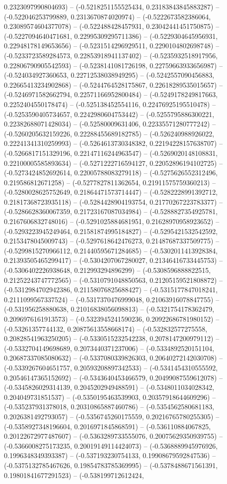 0.2323097990804693) -- (-0.5218251155525434, 0.23183843845883287) -- (-0.522046253799889, 0.2313670874020974) -- (-0.5222673582386064, 0.23089574604377078) -- (-0.522488428457931, 0.23042441451750875) -- (-0.5227094640471681, 0.22995309295711386) -- (-0.5229304645956931, 0.22948178149653656) -- (-0.5231514296929511, 0.2290104802698748) -- (-0.5233723589284573, 0.22853918941137402) -- (-0.5235932518917956, 0.22806790905542593) -- (-0.5238141081726198, 0.22759663933656987) -- (-0.524034927360653, 0.22712538038949295) -- (-0.5242557090456883, 0.22665413234902868) -- (-0.5244764528175867, 0.22618289535015657) -- (-0.5246971582662794, 0.22571166952800484) -- (-0.5249178249817663, 0.2252404550178474) -- (-0.525138452554116, 0.22476925195510478) -- (-0.5253590405734657, 0.2242980604753442) -- (-0.5255795886300221, 0.22382688071428034) -- (-0.52580009631406, 0.22335571280777242) -- (-0.5260205632159226, 0.22288455689182785) -- (-0.526240988926022, 0.22241341310259993) -- (-0.5264613730348382, 0.22194228157638707) -- (-0.5266817151329196, 0.22147116244963547) -- (-0.5269020148108831, 0.22100005585893634) -- (-0.5271222716594127, 0.22052896194102725) -- (-0.5273424852692614, 0.22005788083279118) -- (-0.5275626552312496, 0.219586812671258) -- (-0.5277827811362654, 0.21911575759360213) -- (-0.5280028625752649, 0.21864471573714447) -- (-0.5282228991392712, 0.21817368723935118) -- (-0.5284428904193754, 0.21770267223783377) -- (-0.5286628360067359, 0.21723167087034984) -- (-0.5288827354925781, 0.2167606832748016) -- (-0.5291025884681951, 0.21628970958923652) -- (-0.5293223945249464, 0.21581874995184827) -- (-0.5295421532542592, 0.2153478045009743) -- (-0.5297618642476273, 0.21487687337509775) -- (-0.5299815270966112, 0.21440595671284685) -- (-0.5302011413928384, 0.21393505465299417) -- (-0.5304207067280027, 0.21346416733445753) -- (-0.5306402226938648, 0.212993294896299) -- (-0.5308596888822515, 0.21252243747772565) -- (-0.5310791048850563, 0.21205159521808872) -- (-0.5312984702942386, 0.21158076825688427) -- (-0.5315177847018241, 0.2111099567337524) -- (-0.5317370476999048, 0.21063916078847755) -- (-0.531956258880638, 0.21016838056098813) -- (-0.5321754178362479, 0.2096976161913573) -- (-0.5323945241590236, 0.20922686781980152) -- (-0.53261357744132, 0.20875613558668174) -- (-0.532832577275558, 0.20828541963250205) -- (-0.5330515232542238, 0.2078147200979112) -- (-0.5332704149698689, 0.2073440371237006) -- (-0.5334892520151104, 0.20687337085080632) -- (-0.5337080339826303, 0.20640272142030708) -- (-0.5339267604651757, 0.20593208897342533) -- (-0.5341454310555592, 0.20546147365152692) -- (-0.5343640453466579, 0.20499087559612078) -- (-0.5345826029314139, 0.2045202949488591) -- (-0.5348011034028342, 0.204049731851537) -- (-0.5350195463539903, 0.20357918644609296) -- (-0.535237931378018, 0.20310865887460786) -- (-0.5354562580681183, 0.2026381492793057) -- (-0.5356745260175559, 0.20216765780255305) -- (-0.5358927348196604, 0.2016971845868591) -- (-0.536110884067825, 0.20122672977487607) -- (-0.5363289733555076, 0.20075629350939755) -- (-0.5366008275173235, 0.20019149114424073) -- (-0.5368889945976926, 0.1996348349393387) -- (-0.537193230754133, 0.19908679592847536) -- (-0.5375132785467626, 0.19854783785369995) -- (-0.5378488671561391, 0.19801841677291523) -- (-0.538199712612424, 